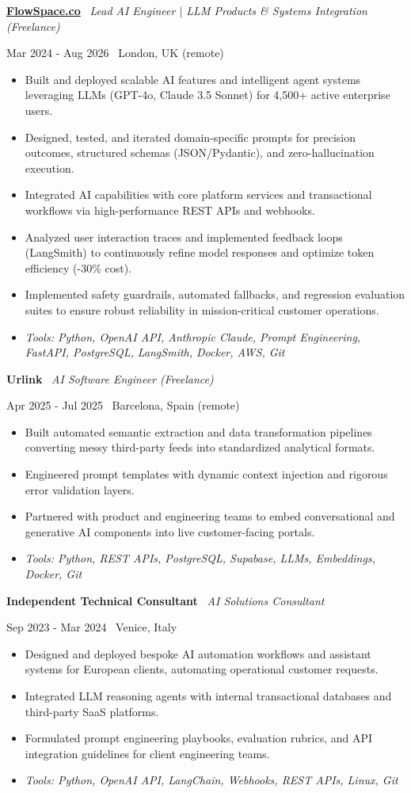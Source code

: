 \documentclass[a4paper,10pt]{article}
\newcommand{\role}[4]{%
  \vspace{2pt}\noindent
  \begin{minipage}[t]{0.70\textwidth}\raggedright\textbf{#1} \textbullet\ \textit{#3}\end{minipage}%
  \hfill
  \begin{minipage}[t]{0.28\textwidth}\raggedleft\footnotesize\color{gray}#2 \textbullet\ #4\end{minipage}%
  \vspace{1pt}%
}
\begin{document}
\role{\href{https://flowspace.co}{FlowSpace.co}}{Mar 2024 - Aug 2026}{Lead AI Engineer $\vert$ LLM Products \& Systems Integration (Freelance)}{London, UK (remote)}
\begin{itemize}
  \item Built and deployed scalable AI features and intelligent agent systems leveraging LLMs (GPT-4o, Claude 3.5 Sonnet) for 4,500+ active enterprise users.
  \item Designed, tested, and iterated domain-specific prompts for precision outcomes, structured schemas (JSON/Pydantic), and zero-hallucination execution.
  \item Integrated AI capabilities with core platform services and transactional workflows via high-performance REST APIs and webhooks.
  \item Analyzed user interaction traces and implemented feedback loops (LangSmith) to continuously refine model responses and optimize token efficiency (-30\% cost).
  \item Implemented safety guardrails, automated fallbacks, and regression evaluation suites to ensure robust reliability in mission-critical customer operations.
  \item \textit{Tools: Python, OpenAI API, Anthropic Claude, Prompt Engineering, FastAPI, PostgreSQL, LangSmith, Docker, AWS, Git}
\end{itemize}

\role{Urlink}{Apr 2025 - Jul 2025}{AI Software Engineer (Freelance)}{Barcelona, Spain (remote)}
\begin{itemize}
  \item Built automated semantic extraction and data transformation pipelines converting messy third-party feeds into standardized analytical formats.
  \item Engineered prompt templates with dynamic context injection and rigorous error validation layers.
  \item Partnered with product and engineering teams to embed conversational and generative AI components into live customer-facing portals.
  \item \textit{Tools: Python, REST APIs, PostgreSQL, Supabase, LLMs, Embeddings, Docker, Git}
\end{itemize}

\role{Independent Technical Consultant}{Sep 2023 - Mar 2024}{AI Solutions Consultant}{Venice, Italy}
\begin{itemize}
  \item Designed and deployed bespoke AI automation workflows and assistant systems for European clients, automating operational customer requests.
  \item Integrated LLM reasoning agents with internal transactional databases and third-party SaaS platforms.
  \item Formulated prompt engineering playbooks, evaluation rubrics, and API integration guidelines for client engineering teams.
  \item \textit{Tools: Python, OpenAI API, LangChain, Webhooks, REST APIs, Linux, Git}
\end{itemize}
\end{document}
